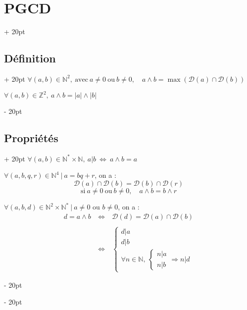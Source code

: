 \documentclass[a4paper, 12pt, twoside]{article}
\newcommand{\N}{\mathbb{N}} %
\newcommand{\Z}{\mathbb{Z}} %
\newcommand{\ssi}{\ \Leftrightarrow \ }
\newcommand{\abs}[1]{\left\lvert #1 \right\rvert} %
\newcommand{\eqsys}[2]{\begin{cases} #1 \\ #2 \end{cases}}
\newcommand{\ind}[1][20pt]{\advance\leftskip + #1}
\newcommand{\deind}[1][20pt]{\advance\leftskip - #1}
\newenvironment{indt}[2][20pt]{#2 \par \ind[#1]}{\par \deind} %
\begin{document}
    \vspace{12pt}
    
    \begin{indt}{\section{PGCD}}
        \begin{indt}{\subsection{Définition}}
            $\forall (a, b) \in \N^2,\ \text{avec}\ a \neq 0\ \text{ou}\ b \neq 0,\quad a \wedge b = \max(\mathcal D(a) \cap \mathcal D(b))$
            
            $\forall (a, b) \in \Z^2,\ a \wedge b = \abs a \wedge \abs b$
        \end{indt}
        
        \vspace{6pt}
        
        \begin{indt}{\subsection{Propriétés}}
            $\forall (a, b) \in \N^* \times \N,\ a|b \ssi a \wedge b = a$
            
            \vspace{6pt}
            
            $\forall (a, b, q, r) \in \N^4\ |\ a = bq + r$, on a :
                \[ \mathcal D(a) \cap \mathcal D(b) = \mathcal D(b) \cap \mathcal D(r) \]
                \[ \text{si}\ a \neq 0\ \text{ou}\ b \neq 0,\quad a \wedge b = b \wedge r \]
            
            \vspace{6pt}
            
            $\forall (a, b, d) \in \N^2 \times \N^*\ |\ a \neq 0$ ou $b \neq 0$, on a :
                \[\begin{array}{rcl}
                    d = a \wedge b
                    &\ssi& \mathcal D(d) = \mathcal D(a) \cap \mathcal D(b)
                    \\
                    \\
                    &\ssi&
                    \begin{cases}
                        d|a
                        \\
                        d|b
                        \\
                        \forall n \in \N,\ \eqsys{n|a}{n|b} \Rightarrow n|d
                    \end{cases}
                \end{array}\]
            

\end{indt}
\end{indt}
\end{document}
